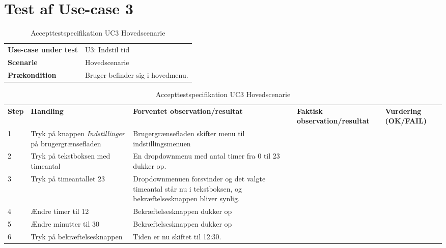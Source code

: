 \section{Test af Use-case 3}
\begin{table}[H]
	\centering
	\caption{Accepttestspecifikation UC3 Hovedscenarie}
	\label{ATUC1:Hovedscenarie}
	\begin{tabular}{ p{80pt}  p{320pt} }\hline
		\rowcolor{white}	
		\textbf{Use-case under test} & U3: Indstil tid \\
		\rowcolor{lightgray}
		\textbf{Scenarie} & Hovedscenarie \\\rowcolor{white}	
		\textbf{Prækondition} & Bruger befinder sig i hovedmenu.
 \\
		\hline
	\end{tabular}
	\begin{tabular}{  p{26pt} p{100pt}  p{101pt} | p{67pt} | p{68pt}}
		\textbf{Step} & \textbf{Handling} & \textbf{Forventet observation/resultat} & \textbf{Faktisk observation/resultat} & \textbf{Vurdering (OK/FAIL)}\\
		1 & Tryk på knappen \emph{Indstillinger} på brugergrænsefladen & Brugergrænsefladen skifter menu til indstillingsmenuen &  &  \\
		2 & Tryk på tekstboksen med timeantal & En dropdownmenu med antal timer fra 0 til 23 dukker op.  &  & \\
		3 & Tryk på timeantallet 23 & Dropdownmenuen forsvinder og det valgte timeantal står nu i tekstboksen, og bekræftelsesknappen bliver synlig. &  &  \\
		
		4 & Ændre timer til 12 & Bekræftelsesknappen dukker op &  &  \\
		5 & Ændre minutter til 30 & Bekræftelsesknappen dukker op &  &  \\	
		6 & Tryk på bekræftelsesknappen & Tiden er nu skiftet til 12:30.  &  &  \\
		\hline
	\end{tabular}
\end{table}

